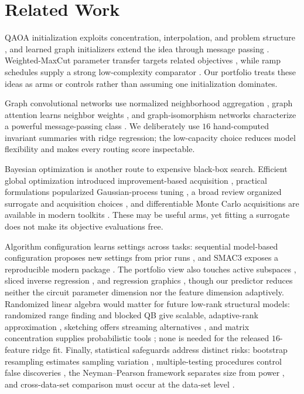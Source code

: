 \documentclass[10pt,twocolumn]{article}
\begin{document}
\section{Related Work}

QAOA initialization exploits concentration, interpolation, and problem structure
\citep{zhou2020qaoa,brandao2018fixed}, and learned graph initializers extend the
idea through message passing \citep{jain2022gnn}.  Weighted-MaxCut parameter
transfer targets related objectives \citep{shaydulin2023weighted}, while ramp
schedules supply a strong low-complexity comparator \citep{montanez2025ramp}.
Our portfolio treats these ideas as arms or controls rather than assuming one
initialization dominates.

Graph convolutional networks use normalized neighborhood aggregation
\citep{kipf2017gcn}, graph attention learns neighbor weights
\citep{velickovic2018gat}, and graph-isomorphism networks characterize a powerful
message-passing class \citep{xu2019gin}.  We deliberately use $16$ hand-computed
invariant summaries with ridge regression; the low-capacity choice reduces model
flexibility and makes every routing score inspectable.

Bayesian optimization is another route to expensive black-box search.  Efficient
global optimization introduced improvement-based acquisition
\citep{jones1998efficient}, practical formulations popularized Gaussian-process
tuning \citep{snoek2012practical}, a broad review organized surrogate and
acquisition choices \citep{shahriari2016taking}, and differentiable Monte Carlo
acquisitions are available in modern toolkits \citep{balandat2020botorch}.  These
may be useful arms, yet fitting a surrogate does not make its objective
evaluations free.

Algorithm configuration learns settings across tasks: sequential model-based
configuration proposes new settings from prior runs \citep{hutter2011sequential},
and SMAC3 exposes a reproducible modern package \citep{lindauer2022smac3}.  The
portfolio view also touches active subspaces \citep{constantine2015active},
sliced inverse regression \citep{li1991sliced}, and regression graphics
\citep{cook1998regression}, though our predictor reduces neither the circuit
parameter dimension nor the feature dimension adaptively.  Randomized linear
algebra would matter for future low-rank structural models: randomized range
finding and blocked QB give scalable, adaptive-rank approximation
\citep{halko2011finding,yu2018randqb}, sketching offers streaming alternatives
\citep{woodruff2014sketching,liberty2013simple}, and matrix concentration
supplies probabilistic tools \citep{tropp2015matrix}; none is needed for the
released $16$-feature ridge fit.  Finally, statistical safeguards address
distinct risks: bootstrap resampling estimates sampling variation
\citep{efron1993bootstrap}, multiple-testing procedures control false discoveries
\citep{benjamini1995controlling}, the Neyman--Pearson framework separates size
from power \citep{neyman1933efficient}, and cross-data-set comparison must occur
at the data-set level \citep{demsar2006statistical}.
\end{document}

